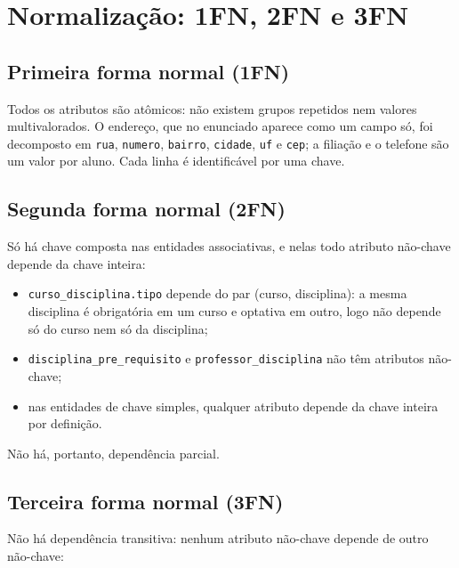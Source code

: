 \documentclass[12pt,a4paper]{article}
\begin{document}
\section{Normalização: 1FN, 2FN e 3FN}
\label{sec:3fn}

\subsection{Primeira forma normal (1FN)}

Todos os atributos são atômicos: não existem grupos repetidos nem
valores multivalorados. O endereço, que no enunciado aparece como um
campo só, foi decomposto em \texttt{rua}, \texttt{numero},
\texttt{bairro}, \texttt{cidade}, \texttt{uf} e \texttt{cep}; a filiação
e o telefone são um valor por aluno. Cada linha é identificável por uma
chave.

\subsection{Segunda forma normal (2FN)}

Só há chave composta nas entidades associativas, e nelas todo atributo
não-chave depende da chave inteira:

\begin{itemize}
  \item \texttt{curso\_disciplina.tipo} depende do par
        (curso, disciplina): a mesma disciplina é obrigatória em um
        curso e optativa em outro, logo não depende só do curso nem só
        da disciplina;
  \item \texttt{disciplina\_pre\_requisito} e
        \texttt{professor\_disciplina} não têm atributos não-chave;
  \item nas entidades de chave simples, qualquer atributo depende da
        chave inteira por definição.
\end{itemize}

Não há, portanto, dependência parcial.

\subsection{Terceira forma normal (3FN)}

Não há dependência transitiva: nenhum atributo não-chave depende de
outro não-chave:
\end{document}
